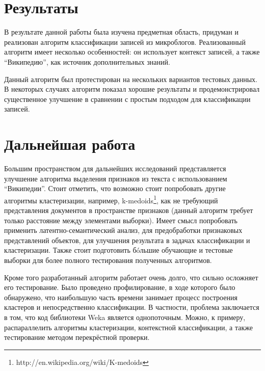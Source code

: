 \conclusion
\label{conclusion}

\section{Результаты}
В результате данной работы была изучена предметная область, придуман и реализован алгоритм классификации записей из микроблогов. Реализованный алгоритм имеет несколько особенностей: он использует контекст записей, а также ``Википедию'', как источник дополнительных знаний.

Данный алгоритм был протестирован на нескольких вариантов тестовых данных. В некоторых случаях алгоритм показал хорошие результаты и продемонстрировал существенное улучшение в сравнении с простым подходом для классификации записей.

\section{Дальнейшая работа}
Большим пространством для дальнейших исследований представляется улучшение алгоритма выделения признаков из текста с использованием ``Википедии''. Стоит отметить, что возможно стоит попробовать другие алгоритмы кластеризации, например, k-medoids\footnote{http://en.wikipedia.org/wiki/K-medoids}, как не требующий представления документов в пространстве признаков (данный алгоритм требует только расстояние между элементами выборки). Имеет смысл попробовать применить латентно-семантический анализ, для предобработки признаковых представлений объектов, для улучшения результата в задачах классификации и кластеризации. Также стоит подготовить б\'oльшие обучающие и тестовые выборки для более полного тестирования полученных алгоритмов. 

Кроме того разработанный алгоритм работает очень долго, что сильно осложняет его тестирование. Было проведено профилирование, в ходе которого было обнаружено, что наибольшую часть времени занимает процесс построения кластеров и непосредственно классификации. В частности, проблема заключается в том, что код библиотеки Weka является однопоточным. Можно, к примеру, распараллелить алгоритмы кластеризации, контекстной классификации, а также тестирование методом перекрёстной проверки. 

